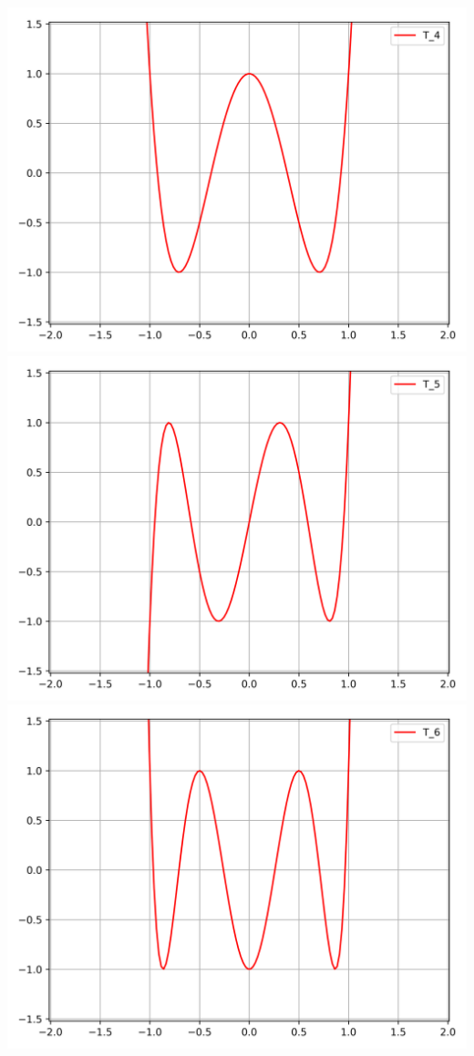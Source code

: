 \documentclass[11pt,class=report,crop=false]{standalone}
\begin{document}
\begin{center}
  \includegraphics[scale=\myscale,scale=0.3]{figures/approx-tchebychev-01-4} \qquad
  \includegraphics[scale=\myscale,scale=0.3]{figures/approx-tchebychev-01-5} \qquad
  \includegraphics[scale=\myscale,scale=0.3]{figures/approx-tchebychev-01-6} 
\end{center}
\end{document}
